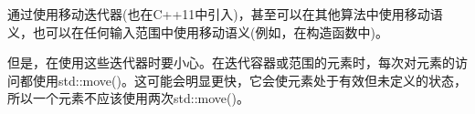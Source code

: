 通过使用移动迭代器(也在C++11中引入)，甚至可以在其他算法中使用移动语义，也可以在任何输入范围中使用移动语义(例如，在构造函数中)。\par

但是，在使用这些迭代器时要小心。在迭代容器或范围的元素时，每次对元素的访问都使用std::move()。这可能会明显更快，它会使元素处于有效但未定义的状态，所以一个元素不应该使用两次std::move()。\par
































































